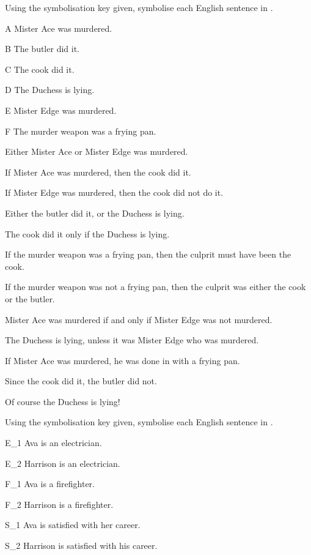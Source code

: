 \problempart Using the symbolisation key given, symbolise each English sentence in \TFL.
\begin{ekey}
\item[A] Mister Ace was murdered.
\item[B] The butler did it.
\item[C] The cook did it.
\item[D] The Duchess is lying.
\item[E] Mister Edge was murdered.
\item[F] The murder weapon was a frying pan.
\end{ekey}
\begin{earg}
\item Either Mister Ace or Mister Edge was murdered.
\item If Mister Ace was murdered, then the cook did it.
\item If Mister Edge was murdered, then the cook did not do it.
\item Either the butler did it, or the Duchess is lying.
\item The cook did it only if the Duchess is lying.
\item If the murder weapon was a frying pan, then the culprit must have been the cook.
\item If the murder weapon was not a frying pan, then the culprit was either the cook or the butler.
\item Mister Ace was murdered if and only if Mister Edge was not murdered.
\item The Duchess is lying, unless it was Mister Edge who was murdered.
\item If Mister Ace was murdered, he was done in with a frying pan.
\item Since the cook did it, the butler did not.
\item Of course the Duchess is lying!
\end{earg}
\solutions
\problempart Using the symbolisation key given, symbolise each English sentence in \TFL.\label{pr.avacareer}
	\begin{ekey}
		\item[E_1] Ava is an electrician.
		\item[E_2] Harrison is an electrician.
		\item[F_1] Ava is a firefighter.
		\item[F_2] Harrison is a firefighter.
		\item[S_1] Ava is satisfied with her career.
		\item[S_2] Harrison is satisfied with his career.
	\end{ekey}
